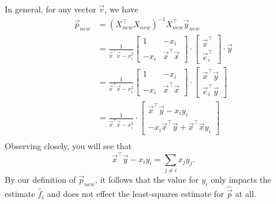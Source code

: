 \begin{enumerate}
{  In general, for any vector $\vec{v}$, we have
  \begin{equation}
    \begin{split}
      \vec{p}_{new} &= (X_{new}^\top X_{new})^{-1} X_{new}^\top \vec{y}_{new} \\ 
      &= \frac{1}{\vec{x}^\top \vec{x}-x_i^2}  
      \begin{bmatrix}
        1 & -x_i \\
        -x_i & \vec{x}^\top \vec{x}
      \end{bmatrix} \cdot
      \begin{bmatrix}
        \vec{x}^\top \\
        \vec{e}_i^\top
      \end{bmatrix} \cdot \vec{y} \\
      &= \frac{1}{\vec{x}^\top \vec{x}-x_i^2}  
      \begin{bmatrix}
        1 & -x_i \\
        -x_i & \vec{x}^\top \vec{x}
      \end{bmatrix} \cdot
      \begin{bmatrix}
        \vec{x}^\top \vec{y} \\
        \vec{e}_i^\top \vec{y}
      \end{bmatrix} \\
      &= \frac{1}{\vec{x}^\top \vec{x}-x_i^2}  
      \cdot
      \begin{bmatrix}
        \vec{x}^\top \vec{y} - x_i y_i \\
        -x_i \vec{x}^\top \vec{y} + \vec{x}^\top \vec{x}y_i
      \end{bmatrix} \\
    \end{split}
  \end{equation}
  Observing closely, you will see that
  $$
    \vec{x}^\top \vec{y} - x_i y_i = \sum_{j\neq i} x_j y_j.
  $$
  By our definition of $\vec{p}_{new}$, it follows that the value for $y_i$ only impacts the estimate $\widehat{f}_i$ and does not effect the least-squares estimate for $\widehat{\vec{p}}$ at all.
  
}






\end{enumerate}
